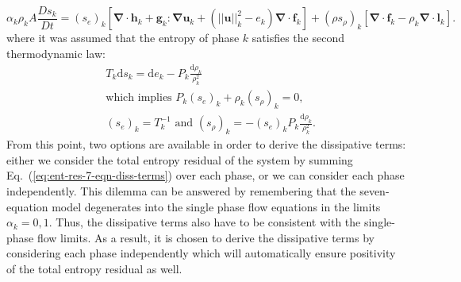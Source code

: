 \documentclass[preprint,10pt]{elsarticle}
\renewcommand{\div}{\mbold{\nabla}\! \cdot \!}
\newcommand{\grad}{\mbold{\nabla}}
\newcommand{\mbold}[1]{\boldsymbol#1}
\newcommand{\eqt}[1]{Eq.~(\ref{#1})}                     %
\begin{document}
%
\begin{equation}\label{eq:ent-res-7-eqn-diss-terms}
\alpha_k \rho_k A \frac{Ds_k}{Dt} = \left(s_e\right)_k \left[ \div \mbold h_k + \mbold g_k : \grad \mbold u_k +  \left( || \mbold u ||^2_k - e_k\right) \div \mbold f_k  \right] + (\rho s_\rho)_k \left[ \div \mbold f_k - \rho_k \div \mbold l_k \right].
\end{equation}
%
where it was assumed that the entropy of phase $k$ satisfies the second thermodynamic law: 
%
\begin{align}\label{eq:2nd-therm-laws-sect4}
&T_k \text{d} s_k = \text{d}e_k - P_k\frac{\text{d}\rho_k}{\rho_k^2} \nonumber \\
& \text{which implies } P_k (s_e)_k + \rho_k (s_\rho)_k = 0, \\
& (s_e)_k = T_k^{-1} \text{ and } (s_\rho)_k = - (s_e)_k P_k \frac{\text{d}\rho_k}{\rho_k^2}. \nonumber
\end{align}
% 
From this point, two options are available in order to derive the dissipative terms: either we consider the total entropy residual of the system by summing \eqt{eq:ent-res-7-eqn-diss-terms} over each phase, or we can consider each phase independently. This dilemma can be answered by remembering that the seven-equation model degenerates into the single phase flow equations in the limits $\alpha_k = 0,1$. Thus, the dissipative terms also have to be consistent with the single-phase flow limits. As a result, it is chosen to derive the dissipative terms by considering each phase independently which will automatically ensure positivity of the total entropy residual as well.
\end{document}
